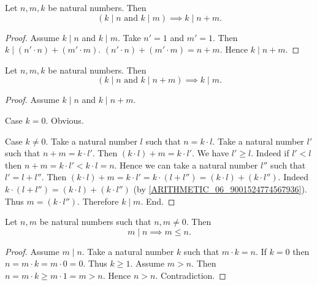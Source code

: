 \documentclass[10pt]{article}
\begin{document}
  \begin{forthel}
    \begin{corollary}
      Let $n, m, k$ be natural numbers.
      Then \[ (\text{$k \mid n$ and $k \mid m$}) \implies k \mid n + m. \]
    \end{corollary}
    \begin{proof}
      Assume $k \mid n$ and $k \mid m$.
      Take $n' = 1$ and $m' = 1$.
      Then $k \mid (n' \cdot n) + (m' \cdot m)$.
      $(n' \cdot n) + (m' \cdot m) = n + m$.
      Hence $k \mid n + m$.
    \end{proof}
  \end{forthel}

  \begin{forthel}
    \begin{proposition}
      Let $n, m, k$ be natural numbers.
      Then \[ (\text{$k \mid n$ and $k \mid n + m$}) \implies k \mid m. \]
    \end{proposition}
    \begin{proof}
      Assume $k \mid n$ and $k \mid n + m$.

      Case $k = 0$. Obvious.

      Case $k \neq 0$.
        Take a natural number $l$ such that $n = k \cdot l$.
        Take a natural number $l'$ such that $n + m = k \cdot l'$.
        Then $(k \cdot l) + m = k \cdot l'$.
        We have $l' \geq l$.
        Indeed if $l' < l$ then
        $n + m
          = k \cdot l'
          < k \cdot l
          = n$.
        Hence we can take a natural number $l''$ such that $l' = l + l''$.
        Then $(k \cdot l) + m
          = k \cdot l'
          = k \cdot (l + l'')
          = (k \cdot l) + (k \cdot l'')$.
        Indeed $k \cdot (l + l'') = (k \cdot l) + (k \cdot l'')$
        (by \cref{ARITHMETIC_06_9001524774567936}).
        Thus $m = (k \cdot l'')$.
        Therefore $k \mid m$.
      End.
    \end{proof}
  \end{forthel}

  \begin{forthel}
    \begin{proposition}
      Let $n, m$ be natural numbers such that $n, m \neq 0$.
      Then \[ m \mid n \implies m \leq n. \]
    \end{proposition}
    \begin{proof}
      Assume $m \mid n$.
      Take a natural number $k$ such that $m \cdot k = n$.
      If $k = 0$ then
      $n
        = m \cdot k
        = m \cdot 0
        = 0$.
      Thus $k \geq 1$.
      Assume $m > n$.
      Then $n
        = m \cdot k
        \geq m \cdot 1
        = m
        > n$.
      Hence $n > n$.
      Contradiction.
    \end{proof}
  \end{forthel}
\end{document}
